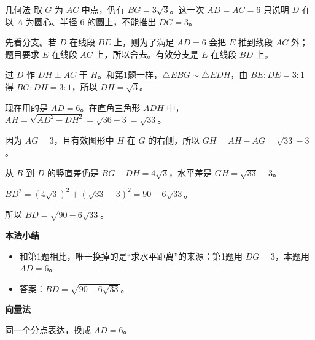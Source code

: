 \documentclass{exam-zh}
\newenvironment{eduSubQuestionItem}[1]{%
  \needspace{4\baselineskip}%
  \vspace{2mm}
  \par\noindent
  \hangindent=8mm\hangafter=1
  {\color{edu-blue}\bfseries #1}\enspace
  \begingroup
  \color{edu-ink}
}{%
  \endgroup
  \par
  \vspace{3mm}
}
\newenvironment{eduBulletList}{%
  \begin{itemize}[
    label=\textbullet,
    leftmargin=5mm,
    itemsep=1.2mm,
    topsep=0pt,
    parsep=0pt
  ]
}{%
  \end{itemize}
}
\begin{document}
\begin{eduSolutionBox}{几何法}
  \begingroup
  \setlength{\parskip}{2.5mm}
取 $G$ 为 $AC$ 中点，仍有 $BG=3\sqrt3$。这一次 $AD=AC=6$ 只说明 $D$ 在以 $A$ 为圆心、半径 $6$ 的圆上，不能推出 $DG=3$。\par
先看分支。若 $D$ 在线段 $BE$ 上，则为了满足 $AD=6$ 会把 $E$ 推到线段 $AC$ 外；题目要求 $E$ 在线段 $AC$ 上，所以舍去。有效分支是 $E$ 在线段 $BD$ 上。\par
过 $D$ 作 $DH\perp AC$ 于 $H$。和第1题一样，$\triangle EBG\sim\triangle EDH$，由 $BE:DE=3:1$ 得 $BG:DH=3:1$，所以 $DH=\sqrt3$。\par
现在用的是 $AD=6$。在直角三角形 $ADH$ 中，$AH=\sqrt{AD^2-DH^2}=\sqrt{36-3}=\sqrt{33}$。\par
因为 $AG=3$，且有效图形中 $H$ 在 $G$ 的右侧，所以 $GH=AH-AG=\sqrt{33}-3$。\par
从 $B$ 到 $D$ 的竖直差仍是 $BG+DH=4\sqrt3$，水平差是 $GH=\sqrt{33}-3$。\par
$BD^2=(4\sqrt3)^2+(\sqrt{33}-3)^2=90-6\sqrt{33}$。\par
所以 $BD=\sqrt{90-6\sqrt{33}}$。\par
  \endgroup
  \vspace{2.5mm}
  {\color{edu-blue}\bfseries\small 本法小结}\par\vspace{1.5mm}
  \begin{eduBulletList}
    \item 和第1题相比，唯一换掉的是“求水平距离”的来源：第1题用 $DG=3$，本题用 $AD=6$。    \item 答案：$BD=\sqrt{90-6\sqrt{33}}$。  \end{eduBulletList}
\end{eduSolutionBox}




\begin{eduSubQuestionItem}{向量法}
同一个分点表达，换成 $AD=6$。\end{eduSubQuestionItem}
\end{document}
